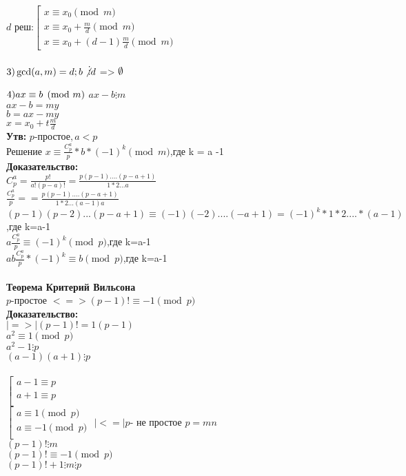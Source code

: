 \documentclass[12pt]{article}
\begin{document}
$d \text{ реш:}\left[ \begin{array}{l}
x \equiv x_0 \pmod{m} \\
x \equiv x_0 + \frac{m}{d} \pmod{m} \\
x \equiv x_0 + (d-1)\frac{m}{d} \pmod{m}
\end{array} \right.
$
\vspace{0.5cm} %

$3)
\gcd(a, m) = d ; b \not\vdots d $   => $\emptyset  \\$

$4)
ax \equiv b \pmod{m} \\$
$ax - b \vdots m$\\
$ax - b = my$\\
$b =ax- my$\\
$x=x_0+t\frac{m}{d}$\\

\textbf{Утв:}
$p$-простое$ , a<p $\\
Решение  $x\equiv \frac{C_p^a}{p}*b*(-1)^k \pmod{m}$,где k = a -1\\
\textbf{Доказательство:}\\ 
$ C_p^a = \frac{p!}{a!(p-a)!}=\frac{p(p-1)....(p-a+1)}{1*2...a} $\\
$\frac{C_p^a}{p}= =\frac{p(p-1)....(p-a+1)}{1*2...(a-1)a}$\\
$(p-1)(p-2)...(p-a+1)\equiv (-1)(-2)....(-a+1) = (-1)^k*1*2....*(a-1)$,где k=a-1\\
$a\frac{C_p^a}{p}\equiv (-1)^k \pmod{p}$,где k=a-1\\
$ab\frac{C_p^a}{p} * (-1)^k\equiv b \pmod{p} $,где k=a-1\\
\\
\textbf{Теорема Критерий Вильсона}
\\
$p$-простое $<=> (p-1)! \equiv -1 \pmod{p} $\\
\textbf{Доказательство:}\\ 
$|=>|  (p-1)!= 1(p-1) $\\
$a^2 \equiv 1 \pmod{p}$\\
$a^2 -1 \vdots p$\\
$(a-1)(a+1) \vdots p$\\
\\
$\left[ \begin{array}{l}
a-1  \equiv p\\
a+1  \equiv p\\
\end{array} \right.
$
\\$\left[ \begin{array}{l}
a \equiv 1 \pmod{p}\\
a \equiv -1 \pmod{p}\\
\end{array} \right.
$
$|<=| p $- не простое $p = mn$\\
$(p-1)!\vdots m $\\
$(p-1)!\equiv -1 \pmod{p}$\\
$(p-1)!+1\vdots m\vdots p $\\
\end{document}
